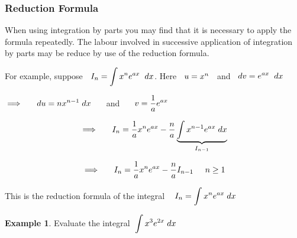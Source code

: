 \documentclass[11pt,a4paper]{article}
\theoremstyle{definition}
\newtheorem{exa}[thm]{Example}
\begin{document}
\subsubsection{Reduction Formula}
When using integration by parts you may find that it is necessary  to apply the formula repeatedly. The labour involved in successive application of integration by parts may be reduce by use of the reduction formula.


For example, suppose $\hspace{0.2cm} \displaystyle{I_n = \int x^ne^{ax}\hspace{0.2cm}dx}$. Here $\hspace{0.2cm} u = x^n\hspace{0.2cm}$ and $\hspace{0.2cm} dv = \displaystyle{e^{ax}\hspace{0.2cm}dx}$


$\implies\hspace{0.5cm} \displaystyle{du  = n x^{n - 1}\hspace{0.1cm}dx}\hspace{0.5cm}$ and $\hspace{0.5cm}\displaystyle{v = \dfrac{1}{a}e^{ax}}$


$$\implies \hspace{0.5cm} I_n = \frac{1}{a}x^ne^{ax} - \dfrac{n}{a}\underbrace{\int x^{n-1}e^{ax}\hspace{0.1cm} dx}_{I_{n-1}}$$

$$\implies \hspace{0.5cm} I_n = \frac{1}{a}x^ne^{ax} - \dfrac{n}{a}I_{n-1}\hspace{0.5cm} n\geq 1$$


This is the reduction formula of the integral $\hspace{0.3cm}\displaystyle{I_n = \int x^n e^{ax}\hspace{0.1cm}dx}$


\begin{exa}


Evaluate the integral $\hspace{0.1cm} \displaystyle{\int x^3 e^{2x}\hspace{0.1cm}dx}$
\end{exa}
\end{document}

